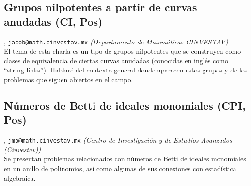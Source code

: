 \subsection{\sffamily Grupos nilpotentes a partir de curvas anudadas {\footnotesize (CI, Pos)}} \label{reg-870} 
, {\tt jacob@math.cinvestav.mx}  {\slshape (Departamento de Matem\'aticas CINVESTAV)}\\
          \noindent El tema de esta charla es un tipo de grupos nilpotentes que se construyen como clases de equivalencia de ciertas curvas anudadas (conocidas en ingl\'es como ``string links''). Hablar\'e del contexto general donde aparecen estos grupos y de los problemas que siguen abiertos en el campo.
\subsection{\sffamily N\'umeros de Betti de ideales monomiales {\footnotesize (CPI, Pos)}} \label{reg-1161} 
, {\tt jmb@math.cinvestav.mx}  {\slshape (Centro de Investigaci\'on y de Estudios Avanzados (Cinvestav))}\\
          \noindent Se presentan problemas relacionados con n\'umeros de Betti de ideales monomiales en un anillo de polinomios, as\'i como algunas de sus conexiones con estad\'istica algebraica.
